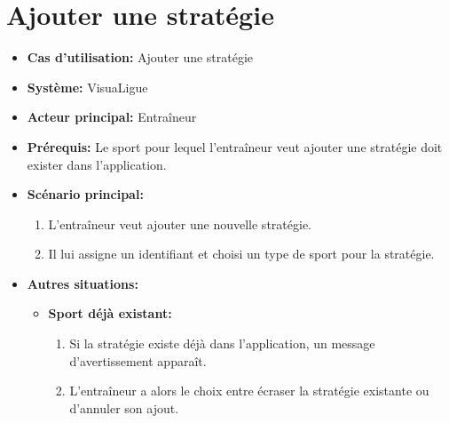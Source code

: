\section{Ajouter une strat\'egie}
\label{sec:ajouter_une_strat'egie}
\begin{itemize}
    \item \textbf{Cas d'utilisation:} Ajouter une strat\'egie
    \item \textbf{Syst\`eme:} VisuaLigue
    \item \textbf{Acteur principal:} Entra\^ineur
    \item \textbf{Pr\'erequis:} Le sport pour lequel l'entraîneur veut ajouter une stratégie doit exister dans l'application.
    \item \textbf{Sc\'enario principal:}
        \begin{enumerate}
            \item L'entra\^ineur veut ajouter une nouvelle strat\'egie.
            \item Il lui assigne un identifiant et choisi un type de sport pour la strat\'egie.
        \end{enumerate}
    \item \textbf{Autres situations:}
        \begin{itemize}
            \item \textbf{Sport d\'ej\`a existant:}
            \begin{enumerate}
                \item Si la stratégie existe d\'ej\`a dans l'application, un message d'avertissement appara\^it.
                \item L'entra\^ineur a alors le choix entre \'ecraser la strat\'egie existante ou d'annuler son ajout.
            \end{enumerate}
        \end{itemize}
\end{itemize}



